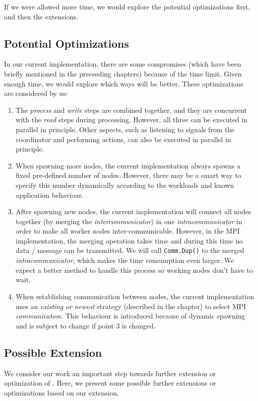 If we were allowed more time, we would explore the potential optimizations first, and then the extensions.

\subsection{Potential Optimizations}
In our current implementation, there are some compromises (which have been briefly mentioned in the preceeding chapters) because of the time limit. Given enough time, we would explore which ways will be better. These optimizations are considered by us:

\begin{enumerate}
	\item The \emph{process} and \emph{write} steps are combined together, and they are concurrent with the \emph{read} steps during processing. However, all three can be executed in parallel in principle. Other aspects, such as listening to signals from the coordinator and performing actions, can also be executed in parallel in principle.
	\item When spawning more nodes, the current implementation always spawns a fixed pre-defined number of nodes. However, there may be a smart way to specify this number dynamically according to the workloads and known application behaviour.
	\item After spawning new nodes, the current implementation will connect all nodes together (by merging the \emph{intercommunicator}) in one \emph{intracommunicator} in order to make all worker nodes inter-communicable. However, in the MPI implementation, the merging operation takes time and during this time no data / message can be transmitted. We will call \lstinline|Comm.Dup()| to the merged \emph{intracommunicator}, which makes the time consumption even larger. We expect a better method to handle this process so working nodes don't have to wait.
	\item When establishing communication between nodes, the current implementation uses an \emph{existing or newest} strategy (described in the \tIncDep chapter) to select MPI \emph{communicator}s. This behaviour is introduced because of dynamic spawning and is subject to change if point 3 is changed.
\end{enumerate}

\subsection{Possible Extension}
We consider our work an important step towards further extension or optimization of \dpy. Here, we present some possible further extensions or optimizations based on our extension. \\

